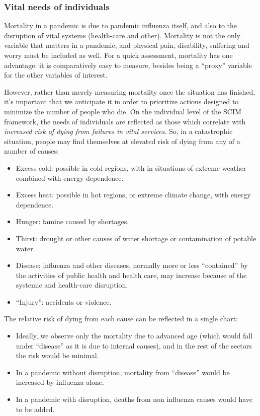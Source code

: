 \documentclass[12pt, a4]{scrartcl}
\begin{document}
\subsubsection{Vital needs of individuals}
Mortality in a pandemic is due to pandemic influenza itself, and also to the disruption of vital systems (health-care and other).
Mortality is not the only variable that matters in a pandemic, and physical pain, disability, suffering and worry must be included as well. For a quick assessment, mortality has one advantage: it is comparatively easy to measure, besides being a “proxy” variable for the other variables of interest.

However, rather than merely measuring mortality once the situation has finished, it's important that we anticipate it in order to prioritize actions designed to minimize the number of people who die. On the individual level of the SCIM framework, the needs of individuals are reflected as those which correlate with \emph{increased risk of dying from failures in vital services.}
So, in a catastrophic situation, people may find themselves at elevated risk of dying from any of a number of causes:

\begin{itemize}
	\item Excess cold: possible in cold regions, with in situations of extreme weather combined with energy dependence.
	\item Excess heat: possible in hot regions, or extreme climate change, with energy dependence.
	\item Hunger: famine caused by shortages.
	\item Thirst: drought or other causes of water shortage or contamination of potable water.
	\item Disease: influenza and other diseases, normally more or less “contained” by the activities of public health and health care, may increase because of the systemic and health-care disruption.
	\item “Injury”: accidents or violence.
\end{itemize}

The relative risk of dying from each cause can be reflected in a single chart:
\begin{itemize}
	\item Ideally, we observe only the mortality due to advanced age (which would fall under “disease” as it is due to internal causes), and in the rest of the sectors the risk would be minimal.
	\item In a pandemic without disruption, mortality from “disease” would be increased by influenza alone.
	\item In a pandemic with disruption, deaths from non influenza causes would have to be added.
\end{itemize}
\end{document}
